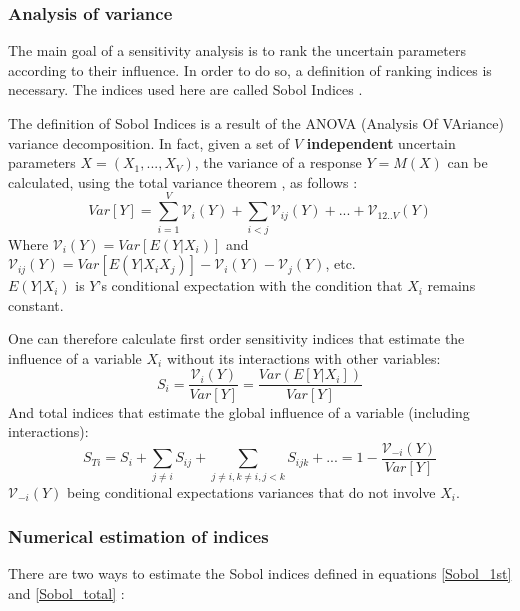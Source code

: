 \subsubsection{Analysis of variance}
\label{subsubsection:ANOVA}
The main goal of a sensitivity analysis is to rank the uncertain parameters according to their influence. In order to do so, a definition of ranking indices is necessary. The indices used here are called Sobol Indices \cite{bib17}.

The definition of Sobol Indices is a result of the ANOVA (Analysis Of VAriance) variance decomposition. In fact, given a set of $V$ \textbf{independent} uncertain parameters $X=(X_1,...,X_V)$, the variance of a response $Y=M(X)$ can be calculated, using the total variance theorem \cite{bib4}, as follows \cite{bib17}: \vspace{-0.2cm}
\begin{equation}
Var[Y] = \sum_{i=1}^{V} \mathcal{V}_i(Y) + \sum_{i<j} \mathcal{V}_{ij}(Y) + ... + \mathcal{V}_{12..V}(Y)
\label{dec_var}
\end{equation}
Where $\mathcal{V}_i(Y)=Var[E(Y|X_i)]$ and $\mathcal{V}_{ij}(Y)=Var[E(Y|X_iX_j)]-\mathcal{V}_i(Y)-\mathcal{V}_j(Y)$, etc. \\ $E(Y|X_i)$ is $Y$'s conditional expectation with the condition that $X_i$ remains constant.

One can therefore calculate first order sensitivity indices that estimate the influence of a variable $X_i$ without its interactions with other variables:
\begin{equation}
S_i = \dfrac{\mathcal{V}_i(Y)}{Var[Y]} = \dfrac{Var(E[Y|X_i])}{Var[Y]}
\label{Sobol_1st}
\end{equation}
And total indices that estimate the global influence of a variable (including interactions):
\begin{equation}
S_{Ti} = S_i + \sum_{j \neq i} S_{ij}  +\sum_{j \neq i, k \neq i, j<k} S_{ijk} + ... = 1 - \dfrac{\mathcal{V}_{-i}(Y)}{Var[Y]}
\label{Sobol_total}
\end{equation}
$\mathcal{V}_{-i}(Y)$ being conditional expectations variances that do not involve $X_{i}$. \\

\subsubsection{Numerical estimation of indices}
There are two ways to estimate the Sobol indices defined in equations \ref{Sobol_1st} and \ref{Sobol_total} :\\


